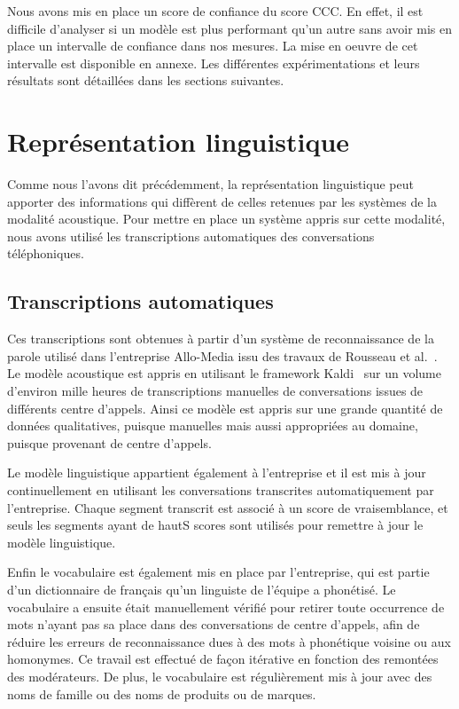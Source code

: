 Nous avons mis en place un score de confiance du score CCC. En effet, il est difficile d'analyser si un modèle est plus performant qu'un autre sans avoir mis en place un intervalle de confiance dans nos mesures. La mise en oeuvre de cet intervalle est disponible en annexe. Les différentes expérimentations et leurs résultats sont détaillées dans les sections suivantes.


\section{Représentation linguistique}
Comme nous l'avons dit précédemment, la représentation linguistique peut apporter des informations qui diffèrent de celles retenues par les systèmes de la modalité acoustique. Pour mettre en place un système appris sur cette modalité, nous avons utilisé les transcriptions automatiques des conversations téléphoniques.

\subsection{Transcriptions automatiques}
Ces transcriptions sont obtenues à partir d'un système de reconnaissance de la parole utilisé dans l'entreprise Allo-Media issu des travaux de Rousseau et al.~\cite{Rousseau2014}. Le modèle acoustique est appris en utilisant le framework Kaldi~\cite{Povey2011} sur un volume d'environ mille heures de transcriptions manuelles de conversations issues de différents centre d'appels. Ainsi ce modèle est appris sur une grande quantité de données qualitatives, puisque manuelles mais aussi appropriées au domaine, puisque provenant de centre d'appels.

Le modèle linguistique appartient également à l'entreprise et il est mis à jour continuellement en utilisant les conversations transcrites automatiquement par l'entreprise. Chaque segment transcrit est associé à un score de vraisemblance, et seuls les segments ayant de hautS scores sont utilisés pour remettre à jour le modèle linguistique.

Enfin le vocabulaire est également mis en place par l'entreprise, qui est partie d'un dictionnaire de français qu'un linguiste de l'équipe a phonétisé. Le vocabulaire a ensuite était manuellement vérifié pour retirer toute occurrence de mots n'ayant pas sa place dans des conversations de centre d'appels, afin de réduire les erreurs de reconnaissance dues à des mots à phonétique voisine ou aux homonymes. Ce travail est effectué de façon itérative en fonction des remontées des modérateurs. De plus, le vocabulaire est régulièrement mis à jour avec des noms de famille ou des noms de produits ou de marques.

